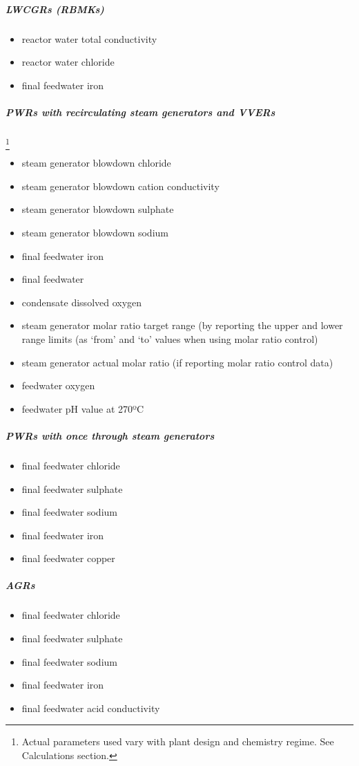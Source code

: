 \subparagraph{LWCGRs (RBMKs)}
\begin{itemize}
\item reactor water total conductivity
\item reactor water chloride
\item final feedwater iron
\end{itemize}

\subparagraph{PWRs with recirculating steam generators and VVERs}\footnote{ Actual parameters used vary with plant design and chemistry regime. See Calculations section.}
\begin{itemize}
\item steam generator blowdown chloride
\item steam generator blowdown cation conductivity
\item steam generator blowdown sulphate
\item steam generator blowdown sodium
\item final feedwater iron
\item final feedwater
\item condensate dissolved oxygen
\item steam generator molar ratio target range (by reporting the upper and lower range limits (as ‘from’ and ‘to’ values when using molar ratio control)
\item steam generator actual molar ratio (if reporting molar ratio control data)
\item feedwater oxygen
\item feedwater pH value at 270ºC
\end{itemize}

\subparagraph{PWRs with once through steam generators}
\begin{itemize}
\item final feedwater chloride
\item final feedwater sulphate
\item final feedwater sodium
\item final feedwater iron
\item final feedwater copper
\end{itemize}

\subparagraph{AGRs}
\begin{itemize}
\item final feedwater chloride
\item final feedwater sulphate
\item final feedwater sodium
\item final feedwater iron
\item final feedwater acid conductivity
\end{itemize}

